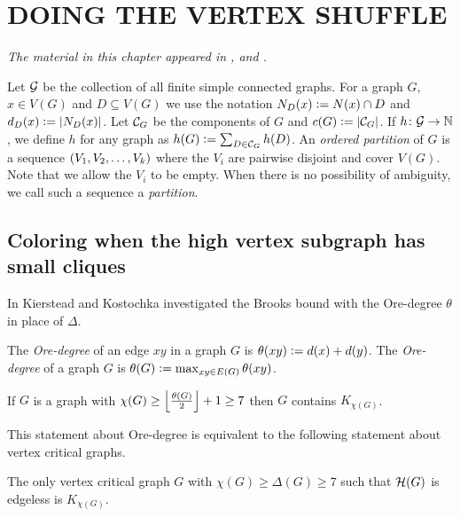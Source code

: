 \chapter{DOING THE VERTEX SHUFFLE}\label{VertexShuffleChapter}
\begin{center}
\emph{The material in this chapter appeared in \cite{rabern2012partitioning}, \cite{rabern2010destroying} and \cite{partitionnote}.}
\end{center}

Let $\mathcal{G}$ be the collection of all finite simple connected graphs. 
For a graph $G$, $x \in V(G)$ and $D \subseteq V(G)$ we use the notation $N_D(x) \mathrel{\mathop:}= N(x) \cap D$ and $d_D(x) \mathrel{\mathop:}= \left|N_D(x)\right|$. 
Let $\mathcal{C}_G$ be the components of $G$ and $c(G) \mathrel{\mathop:}=
\left|\mathcal{C}_G\right|$. If $h\colon \mathcal{G} \rightarrow \mathbb{N}$, we define $h$ for any graph as
$h(G) \mathrel{\mathop:}= \sum_{D \in \mathcal{C}_G} h(D)$.  An
\emph{ordered partition} of $G$ is a sequence $\left( V_1, V_2, \ldots, V_k \right)$ where the $V_i$
are pairwise disjoint and cover $V(G)$.  Note that we allow the $V_i$ to be
empty.  When there is no possibility of ambiguity, we call such a sequence a
\emph{partition}.

\section{Coloring when the high vertex subgraph has small
cliques}\label{ShuffleLowsSection}

In \cite{kierstead2009ore} Kierstead and Kostochka investigated the Brooks bound
with the Ore-degree $\theta$ in place of $\Delta$.

\begin{defn}
The \emph{Ore-degree} of an edge $xy$ in a graph $G$ is $\theta(xy) \mathrel{\mathop:}= d(x) + d(y)$.  The \emph{Ore-degree} of a graph $G$ is $\theta(G) \mathrel{\mathop:}= \max_{xy \in E(G)}\theta(xy)$.
\end{defn}

\begin{thm}
If $G$ is a graph with $\chi(G) \geq \left\lfloor\frac{\theta(G)}{2}\right\rfloor + 1 \geq 7$ then $G$ contains $K_{\chi(G)}$.
\end{thm}

This statement about Ore-degree is equivalent to the following statement about vertex critical graphs.

\begin{thm}
The only vertex critical graph $G$ with $\chi(G) \geq \Delta(G) \geq 7$ such that $\mathcal{H}(G)$ is edgeless is $K_{\chi(G)}$.
\end{thm}

